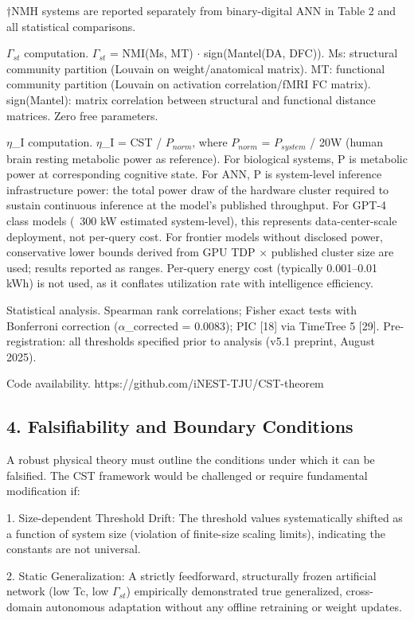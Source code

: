 \documentclass[a4paper,12pt]{article}
\begin{document}
†NMH systems are reported separately from binary-digital ANN in Table 2 and all statistical comparisons.


$\Gamma_{st}$ computation. $\Gamma_{st}$ = NMI(Ms, MT) $\cdot$ sign(Mantel(DA, DFC)). Ms: structural community partition (Louvain on weight/anatomical matrix). MT: functional community partition (Louvain on activation correlation/fMRI FC matrix). sign(Mantel): matrix correlation between structural and functional distance matrices. Zero free parameters.


$\eta$_I computation. $\eta$_I = CST / $P_{norm}$, where $P_{norm}$ = $P_{system}$ / 20W (human brain resting metabolic power as reference). For biological systems, P is metabolic power at corresponding cognitive state. For ANN, P is system-level inference infrastructure power: the total power draw of the hardware cluster required to sustain continuous inference at the model's published throughput. For GPT-4 class models (~300 kW estimated system-level), this represents data-center-scale deployment, not per-query cost. For frontier models without disclosed power, conservative lower bounds derived from GPU TDP $\times$ published cluster size are used; results reported as ranges. Per-query energy cost (typically 0.001--0.01 kWh) is not used, as it conflates utilization rate with intelligence efficiency.


Statistical analysis. Spearman rank correlations; Fisher exact tests with Bonferroni correction ($\alpha$_corrected = 0.0083); PIC [18] via TimeTree 5 [29]. Pre-registration: all thresholds specified prior to analysis (v5.1 preprint, August 2025).


Code availability. https://github.com/iNEST-TJU/CST-theorem



\subsection{4. Falsifiability and Boundary Conditions}

A robust physical theory must outline the conditions under which it can be falsified. The CST framework would be challenged or require fundamental modification if:


1. Size-dependent Threshold Drift: The threshold values systematically shifted as a function of system size (violation of finite-size scaling limits), indicating the constants are not universal.


2. Static Generalization: A strictly feedforward, structurally frozen artificial network (low Tc, low $\Gamma_{st}$) empirically demonstrated true generalized, cross-domain autonomous adaptation without any offline retraining or weight updates.
\end{document}
